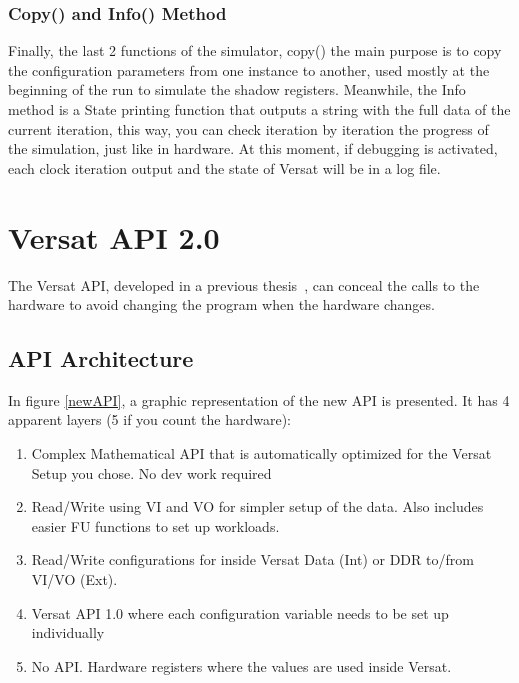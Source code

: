 \documentclass[conference]{IEEEtran}
\begin{document}
\subsubsection{Copy() and Info() Method}

Finally, the last 2 functions of the simulator, copy() the main purpose is to copy the configuration parameters from one instance to another,
used mostly at the beginning of the run to simulate the shadow registers.
Meanwhile, the Info method is a State printing function that outputs a string with the full data of the current iteration,
this way, you can check iteration by iteration the progress of the simulation, just like in hardware.
At this moment, if debugging is activated, each clock iteration output and the state of Versat will be in a log file.

% 






\section{Versat API 2.0}
\label{chapter:API}

The Versat API, developed in a previous thesis~\cite{valter:deepversat}, can conceal
the calls to the hardware to avoid changing the program when the hardware changes.

% 

\subsection{API Architecture}

In figure \ref{newAPI}, a graphic representation of the new API is presented. It has 4 apparent layers (5 if you count the hardware):

\begin{enumerate}
	\item Complex Mathematical API that is automatically optimized for the Versat Setup you chose. No dev work required
	\item Read/Write using VI and VO for simpler setup of the data. Also includes easier FU functions to set up workloads.
	\item Read/Write configurations for inside Versat Data (Int) or DDR to/from VI/VO (Ext).
	\item Versat API 1.0 where each configuration variable needs to be set up individually
	\item No API. Hardware registers where the values are used inside Versat. 
  \end{enumerate}
\end{document}
